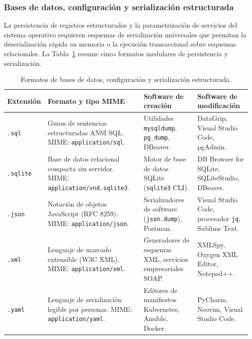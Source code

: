\documentclass[12pt]{article}
\begin{document}
\subsubsection{Bases de datos, configuración y serialización estructurada}
La persistencia de registros estructurados y la parametrización de servicios del sistema operativo requieren esquemas de serialización universales que permitan la deserialización rápida en memoria o la ejecución transaccional sobre esquemas relacionales. La Tabla~\ref{tab:formatosDatos} resume cinco formatos medulares de persistencia y serialización.

\begin{table}[H]
\centering
\scriptsize
\renewcommand{\arraystretch}{0.95}
\renewcommand{\tabularxcolumn}[1]{m{#1}}
\setlength{\emergencystretch}{2em}
\caption{Formatos de bases de datos, configuración y serialización estructurada.}
\label{tab:formatosDatos}
\begin{tabularx}{\textwidth}{>{\centering\arraybackslash}m{1.8cm} X X X}
\toprule
\textbf{Extensión} & \textbf{Formato y tipo MIME} & \textbf{Software de creación} & \textbf{Software de modificación} \\
\midrule
\texttt{.sql} & Guion de sentencias estructuradas ANSI SQL. MIME: \texttt{application/sql}. & Utilidades \texttt{mysqldump}, \texttt{pg\_dump}, DBeaver. & DataGrip, Visual Studio Code, pgAdmin. \\
\texttt{.sqlite} & Base de datos relacional compacta sin servidor. MIME: \texttt{application/\allowbreak vnd.sqlite3}. & Motor de base de datos SQLite (\texttt{sqlite3} CLI). & DB Browser for SQLite, SQLiteStudio, DBeaver. \\
\texttt{.json} & Notación de objetos JavaScript (RFC 8259). MIME: \texttt{application/json}. & Serializadores de software (\texttt{json.dump}), Postman. & Visual Studio Code, procesador \texttt{jq}, Sublime Text. \\
\texttt{.xml} & Lenguaje de marcado extensible (W3C XML). MIME: \texttt{application/xml}. & Generadores de esquemas XML, servicios empresariales SOAP. & XMLSpy, Oxygen XML Editor, Notepad++. \\
\texttt{.yaml} & Lenguaje de serialización legible por personas. MIME: \texttt{application/\allowbreak yaml}. & Editores de manifiestos Kubernetes, Ansible, Docker. & PyCharm, Neovim, Visual Studio Code. \\
\bottomrule
\end{tabularx}
\end{table}
\end{document}
